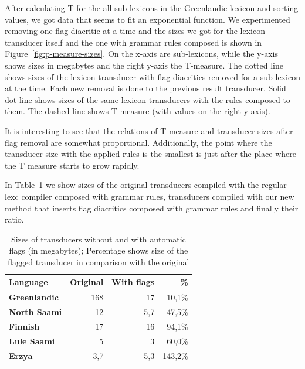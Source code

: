 \documentclass[10pt, a4paper]{article}
\begin{document}
After calculating T for the all sub-lexicons in the Greenlandic lexicon and sorting values, we got data 
that seems to fit an exponential function. We experimented removing one flag diacritic at a 
time and the sizes we got for the lexicon transducer itself and the one with grammar rules composed is shown in 
Figure~\ref{fig:p-measure-sizes}. On the x-axis are sub-lexicons, while the y-axis shows sizes in megabytes and the right 
y-axis the T-measure. The dotted line shows sizes of the lexicon transducer with flag diacritics removed for 
a sub-lexicon at the time. Each new removal is done to the previous result transducer. 
Solid dot line shows sizes of the same lexicon transducers with the rules composed to them. 
The dashed line shows T measure (with values on the right y-axis).  
  
It is interesting to see that the relations of T measure and transducer sizes after flag removal are somewhat proportional. 
Additionally, the point where the transducer size with the applied rules is the smallest is just after the place where 
the T measure starts to grow rapidly. 









In Table~\ref{table:sizes} we show sizes of the original
transducers compiled with the regular lexc compiler composed with grammar rules, transducers compiled
with our new method that inserts flag diacritics composed with grammar rules and finally their ratio.

\begin{table}
    \centering
    \begin{tabular}{|l|r|r|r|}
        \hline
        \bf Language & \bf Original & \bf With flags & \bf \% \\
        \hline\hline
        \bf Greenlandic &   168   & 17 & 10,1\%  \\
        \bf North Saami &   12     & 5,7 & 47,5\%  \\
        \bf Finnish &   17     & 16 & 94,1\%  \\
        \bf Lule Saami  &   5     & 3 & 60,0\%  \\
        \bf Erzya       &   3,7     & 5,3 & 143,2\%  \\
        \hline
    \end{tabular}
    \caption{Sizes of transducers without and with automatic flags (in megabytes); Percentage shows size of the flagged transducer in comparison with the original
    \label{table:sizes}}
\end{table}
\end{document}
